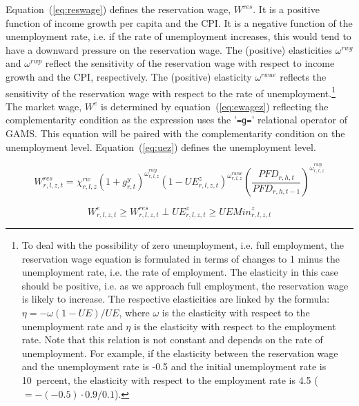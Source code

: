 \documentclass[11pt,letterpaper]{report}
\begin{document}
Equation~(\ref{eq:reswage}) defines the reservation wage,
$\mathit{W}^{\mathit{res}}$. It is a positive function of income growth per
capita and the CPI. It is a negative function of the unemployment rate, i.e.
if the rate of unemployment increases, this would tend to have a downward
pressure on the reservation wage. The (positive) elasticities
$\omega^{\mathit{rwg}}$ and $\omega^{\mathit{rwp}}$ reflect the sensitivity of
the reservation wage with respect to income growth and the CPI, respectively.
The (positive) elasticity $\omega^{\mathit{rwue}}$ reflects the sensitivity of
the reservation wage with respect to the rate of unemployment.\footnote{To deal
with the possibility of zero unemployment, i.e. full employment, the reservation
wage equation is formulated in terms of changes to 1 minus the unemployment
rate, i.e. the rate of employment. The elasticity in this case should be
positive, i.e. as we approach full employment, the reservation wage is likely to
increase. The respective elasticities are linked by the formula:
$\eta=-\omega\left(1-\mathit{UE}\right)/\mathit{UE}$, where $\omega$ is the
elasticity with respect to the unemployment rate and $\eta$ is the elasticity
with respect to the employment rate. Note that this relation is not constant and
depends on the rate of unemployment. For example, if the elasticity between the
reservation wage and the unemployment rate is -0.5 and the initial unemployment
rate is 10~percent, the elasticity with respect to the employment rate is 4.5
($=-(-0.5)\cdot 0.9/0.1$).} The market wage, $W^e$ is determined by
equation~(\ref{eq:ewagez}) reflecting the complementarity condition as the
expression uses the '\texttt{=g=}' relational operator of GAMS. This equation
will be paired with the complementarity condition on the unemployment level.
Equation~(\ref{eq:uez}) defines the unemployment level.

\begin{equation}
\label{eq:reswage}
\mathit{W}^{\mathit{res}}_{r,l,z,t} =
   \chi^{rw}_{r,l,z}
   \left( 1 + g^y_{r,t}
   \right)^{\omega^{\mathit{rwg}}_{r,l,z}}
   \left( {\mathit{1-UE}^z_{r,l,z,t}}
   \right)^{\omega^{\mathit{rwue}}_{r,l,z}}
   \left( \frac {\mathit{PFD}_{r,h,t}} {\mathit{PFD}_{r,h,t-1}}
   \right)^{\omega^{\mathit{rwp}}_{r,l,z}}
\end{equation}

\begin{equation}
\label{eq:ewagez}
\mathit{W}^e_{r,l,z,t} \ge
   \mathit{W}^{\mathit{res}}_{r,l,z,t}
   \perp \mathit{UE}^z_{r,l,z,t} \ge \mathit{UEMin}^z_{r,l,z,t}
\end{equation}
\end{document}
